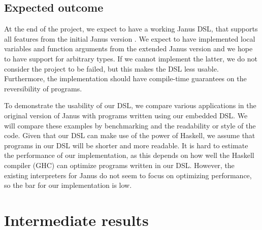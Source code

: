 \documentclass[12pt,a4paper]{article}
\begin{document}
\subsection{Expected outcome}
At the end of the project, we expect to have a working Janus DSL, that supports all features from the initial Janus version \cite{lutz82}. We expect to have implemented local variables and function arguments from the extended Janus version \cite{yokoyama10} and we hope to have support for arbitrary types. If we cannot implement the latter, we do not consider the project to be failed, but this makes the DSL less usable. Furthermore, the implementation should have compile-time guarantees on the reversibility of programs.

To demonstrate the usability of our DSL, we compare various applications in the original version of Janus with programs written using our embedded DSL. We will compare these examples by benchmarking and the readability or style of the code. Given that our DSL can make use of the power of Haskell, we assume that programs in our DSL will be shorter and more readable. It is hard to estimate the performance of our implementation, as this depends on how well the Haskell compiler (GHC) can optimize programs written in our DSL. However, the existing interpreters for Janus do not seem to focus on optimizing performance, so the bar for our implementation is low.

\section{Intermediate results}
\end{document}
